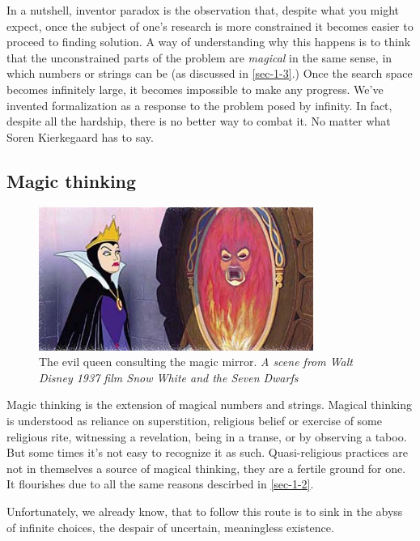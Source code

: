 \documentclass[11pt]{article}
\begin{document}
In a nutshell, inventor paradox is the observation that, despite what you
might expect, once the subject of one's research is more constrained it
becomes easier to proceed to finding solution.  A way of understanding why
this happens is to think that the unconstrained parts of the problem are
\emph{magical} in the same sense, in which numbers or strings can be (as discussed
in \ref{sec-1-3}.)  Once the search space becomes infinitely large, it
becomes impossible to make any progress.  We've invented formalization as a
response to the problem posed by infinity.  In fact, despite all the
hardship, there is no better way to combat it.  No matter what Soren
Kierkegaard has to say.
\subsection{Magic thinking}
\label{sec-1-5}

\begin{figure}[h!]
  \centering
  \includegraphics[width=0.8\textwidth]{./queen.jpg}
  \caption[Mirror, mirror on the wall...]{
    \ssmall The evil queen consulting the magic mirror.
    \textit{A scene from Walt Disney 1937 film 
      Snow White and the Seven Dwarfs}}
\end{figure}

Magic thinking is the extension of magical numbers and strings.  Magical
thinking is understood as reliance on superstition, religious belief or
exercise of some religious rite, witnessing a revelation, being in a transe,
or by observing a taboo.  But some times it's not easy to recognize it as
such.  Quasi-religious practices are not in themselves a source of magical
thinking, they are a fertile ground for one.  It flourishes due to all the
same reasons descirbed in \ref{sec-1-2}.

Unfortunately, we already know, that to follow this route is to sink in the
abyss of infinite choices, the despair of uncertain, meaningless existence.
\end{document}
